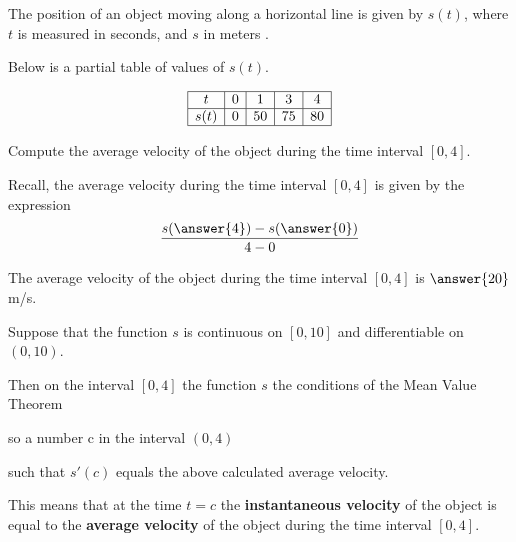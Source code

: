 \documentclass{ximera}
\author{Nela Lakos \and Kyle Parsons}
\begin{document}
The position of an object moving along a horizontal line is given by $s(t)$, where $t$ is measured in seconds, and $s$ in meters .

Below is a partial table of values of $s(t)$.


\[
\begin{array}{|c|c|c|c|c|}
\hline
t & 0 & 1 & 3 & 4\\\hline
s(t) & 0 & 50 & 75 & 80\\\hline
\end{array} 
\]


\begin{exercise}
Compute the average velocity of the object during the time interval $[0,4]$.


\begin{hint}
Recall, the average velocity during the time interval $[0,4]$ is given by the expression 
\[
\frac{s(\answer{4})-s(\answer{0})}{4-0}
\]
\end{hint}


The average velocity of the object during the time interval $[0,4]$ is $\answer{20}$ m/s.

\end{exercise}
\begin{exercise}
Suppose that the function $s$ is continuous on $[0,10]$ and differentiable on $(0,10)$.

 Then  on the interval $[0,4]$ the function $s$  the conditions of the Mean Value Theorem
 
  so  a number c in the interval $(0,4)$ 
  
  such that $s'(c)$ equals the above calculated average velocity.
  

This means that at the time $t=c$ the \textbf{instantaneous velocity} of the object is equal to the \textbf{average velocity} of the object during the time interval $[0,4]$.
\end{exercise}
\end{document}
